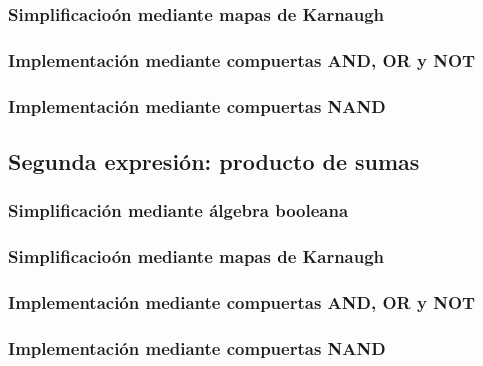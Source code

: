 \subsubsection{Simplificacioón mediante mapas de Karnaugh}



\subsubsection{Implementación mediante compuertas AND, OR y NOT}



\subsubsection{Implementación mediante compuertas NAND}







\subsection{Segunda expresión: producto de sumas}

\subsubsection{Simplificación mediante álgebra booleana}

\subsubsection{Simplificacioón mediante mapas de Karnaugh}

\subsubsection{Implementación mediante compuertas AND, OR y NOT}

\subsubsection{Implementación mediante compuertas NAND}